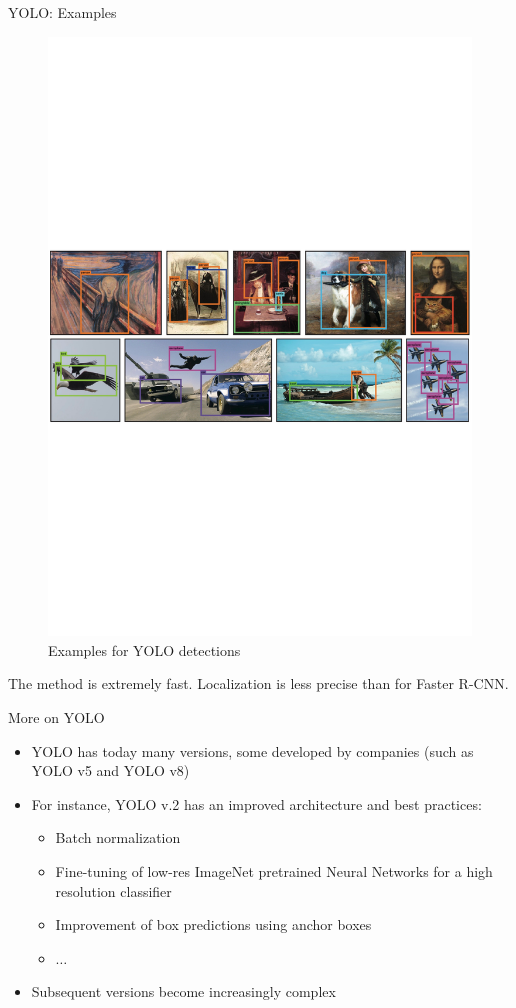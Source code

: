 \documentclass[xcolor=pdftex,dvipsnames,table]{beamer}
\begin{document}
\begin{frame}{YOLO: Examples}
\begin{figure}[htb]
   \centering
   \includegraphics[width=\textwidth]{../graphics/YOLO_ex.pdf}
   \caption{Examples for YOLO detections}
\end{figure}
The method is extremely fast. Localization is less precise than for Faster R-CNN. 
\end{frame}

\begin{frame}{More on YOLO}
\begin{itemize}
   \item YOLO has today many versions, some developed by companies (such as YOLO v5 and YOLO v8)
   \item For instance, YOLO v.2 has an improved architecture and best practices: 
   \begin{itemize}
      \item Batch normalization
      \item Fine-tuning of low-res ImageNet pretrained Neural Networks for a high resolution classifier 
      \item Improvement of box predictions using anchor boxes
      \item $\ldots$
   \end{itemize}
   \item Subsequent versions become increasingly complex
\end{itemize}
\end{frame}
\end{document}
